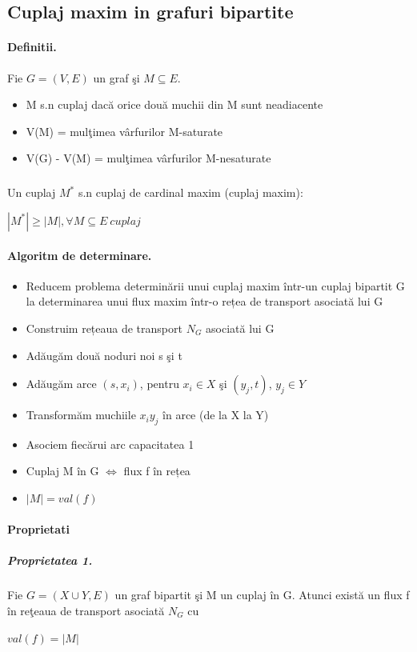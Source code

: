 \documentclass{article}
\begin{document}
\subsection*{Cuplaj maxim in grafuri bipartite}
\paragraph*{Definitii.} Fie $G = (V, E)$ un graf şi $M \subseteq E$.
\begin{itemize}
    \item M s.n cuplaj dacă orice două muchii din M sunt neadiacente
    \item V(M) = mulţimea vârfurilor M-saturate
    \item V(G) - V(M) = mulţimea vârfurilor M-nesaturate
\end{itemize}

\subparagraph*{} Un cuplaj $M^*$ s.n cuplaj de cardinal maxim (cuplaj maxim):
\begin{center}
    $| M^*| \geq |M|,  \forall M \subseteq E\ cuplaj$
\end{center}

\paragraph*{Algoritm de determinare.} 
\begin{itemize}
    \item Reducem problema determinării unui cuplaj maxim într-un cuplaj bipartit G la determinarea unui flux maxim într-o rețea de transport asociată lui G
    \item Construim rețeaua de transport $N_G$ asociată lui G
    \item Adăugăm două noduri noi s şi t
    \item Adăugăm arce $(s,x_i)$, pentru $x_i \in X$ şi $(y_j, t)$, $y_j \in Y$
    \item Transformăm muchiile $x_iy_j$ în arce (de la X la Y)
    \item Asociem fiecărui arc capacitatea 1
    \item Cuplaj M în G $\Leftrightarrow$ flux f în rețea
    \item $|M|=val(f)$
\end{itemize}

\paragraph*{Proprietati}
\subparagraph*{Proprietatea 1.} Fie $G=(X \cup Y, E)$ un graf bipartit şi M un cuplaj în G. Atunci există un flux f în reţeaua de transport asociată $N_G$ cu
\begin{center}
    $val(f) = |M|$
\end{center}
\end{document}
